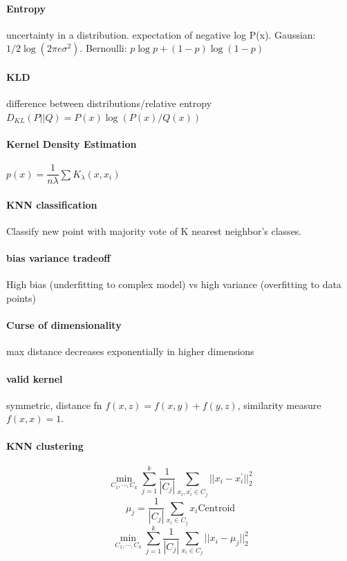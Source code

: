 \documentclass[11pt]{article}
\begin{document}
\paragraph{Entropy} uncertainty in a distribution. expectation of negative log P(x). Gaussian: $1/2 \log (2 \pi e \sigma^2)$. Bernoulli: $p \log p + (1 - p) \log(1 - p)$

\paragraph{KLD} difference between distributions/relative entropy $D_{KL} (P || Q) = P(x) \log (P(x) / Q(x))$

\paragraph{Kernel Density Estimation} $p(x) = \dfrac{1}{n \lambda} \sum K_\lambda (x, x_i)$

\paragraph{KNN classification} Classify new point with majority vote of K nearest neighbor's classes.

\paragraph{bias variance tradeoff} High bias (underfitting to complex model) vs high variance (overfitting to data points)

\paragraph{Curse of dimensionality} max distance decreases exponentially in higher dimensions

\paragraph{valid kernel} symmetric, distance fn $f(x, z) = f(x, y) + f(y, z)$, similarity measure $f(x, x) = 1$.

\paragraph{KNN clustering}

$$\min_{C_1, \cdots, C_k} \sum_{j=1}^{k} \dfrac{1}{|C_j|} \sum_{x_i, x_i^\prime \in C_j} ||x_i - x_i^\prime||_2^2$$
$$\mu_j = \dfrac{1}{|C_j|} \sum_{x_i \in C_j} x_i \text{Centroid}$$
$$\min_{C_1, \cdots, C_k} \sum_{j=1}^{k} \dfrac{1}{|C_j|} \sum_{x_i \in C_j} ||x_i - \mu_j||_2^2$$
\end{document}
